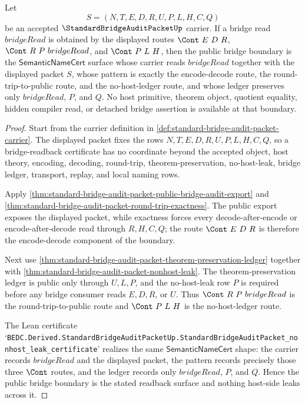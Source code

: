 \begin{theorem}
\label{thm:standard-bridge-audit-packet-bridge-readback-boundary}
Let
$$
S=(N,T,E,D,R,U,P,L,H,C,Q)
$$
be an accepted $\StandardBridgeAuditPacketUp$ carrier. If a bridge read $bridgeRead$ is obtained by the displayed routes $\Cont\ E\ D\ R$, $\Cont\ R\ P\ bridgeRead$, and $\Cont\ P\ L\ H$, then the public bridge boundary is the $\mathsf{SemanticNameCert}$ surface whose carrier reads $bridgeRead$ together with the displayed packet $S$, whose pattern is exactly the encode-decode route, the round-trip-to-public route, and the no-host-ledger route, and whose ledger preserves only $bridgeRead$, $P$, and $Q$. No host primitive, theorem object, quotient equality, hidden compiler read, or detached bridge assertion is available at that boundary.
\end{theorem}
\begin{proof}
Start from the carrier definition in \autoref{def:standard-bridge-audit-packet-carrier}. The displayed packet fixes the rows $N,T,E,D,R,U,P,L,H,C,Q$, so a bridge-readback certificate has no coordinate beyond the accepted object, host theory, encoding, decoding, round-trip, theorem-preservation, no-host-leak, bridge ledger, transport, replay, and local naming rows.

Apply \autoref{thm:standard-bridge-audit-packet-public-bridge-audit-export} and \autoref{thm:standard-bridge-audit-packet-round-trip-exactness}. The public export exposes the displayed packet, while exactness forces every decode-after-encode or encode-after-decode read through $R,H,C,Q$; the route $\Cont\ E\ D\ R$ is therefore the encode-decode component of the boundary.

Next use \autoref{thm:standard-bridge-audit-packet-theorem-preservation-ledger} together with \autoref{thm:standard-bridge-audit-packet-nonhost-leak}. The theorem-preservation ledger is public only through $U,L,P$, and the no-host-leak row $P$ is required before any bridge consumer reads $E,D,R$, or $U$. Thus $\Cont\ R\ P\ bridgeRead$ is the round-trip-to-public route and $\Cont\ P\ L\ H$ is the no-host-ledger route.

The Lean certificate `\texttt{BEDC.Derived.StandardBridgeAuditPacketUp.StandardBridgeAuditPacket\_nonhost\_leak\_certificate}' realizes the same $\mathsf{SemanticNameCert}$ shape: the carrier records $bridgeRead$ and the displayed packet, the pattern records precisely those three $\Cont$ routes, and the ledger records only $bridgeRead$, $P$, and $Q$. Hence the public bridge boundary is the stated readback surface and nothing host-side leaks across it.
\end{proof}

